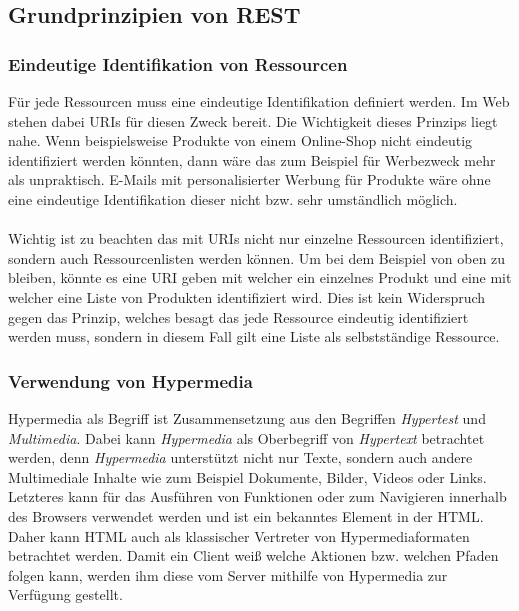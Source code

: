 \subsection{Grundprinzipien von REST}\label{sec:basePricipleREST}
\subsubsection{Eindeutige Identifikation von Ressourcen}
Für jede Ressourcen muss eine eindeutige Identifikation definiert werden. Im Web stehen dabei \glspl{URI} für diesen Zweck bereit. Die Wichtigkeit dieses Prinzips liegt nahe. Wenn beispielsweise Produkte von einem Online-Shop nicht eindeutig identifiziert werden könnten, dann wäre das zum Beispiel für Werbezweck mehr als unpraktisch. E-Mails mit personalisierter Werbung für Produkte wäre ohne eine eindeutige Identifikation dieser nicht bzw. sehr umständlich möglich.\\
\\
Wichtig ist zu beachten das mit \glspl{URI} nicht nur einzelne Ressourcen identifiziert, sondern auch Ressourcenlisten werden können. Um bei dem Beispiel von oben zu bleiben, könnte es eine \gls{URI} geben mit welcher ein einzelnes Produkt und eine mit welcher eine Liste von Produkten identifiziert wird. Dies ist kein Widerspruch gegen das Prinzip, welches besagt das jede Ressource eindeutig identifiziert werden muss, sondern in diesem Fall gilt eine Liste als selbstständige Ressource.

\subsubsection{Verwendung von Hypermedia}
Hypermedia als Begriff ist Zusammensetzung aus den Begriffen \textit{Hypertest} und \textit{Multimedia}. Dabei kann \textit{Hypermedia} als Oberbegriff von \textit{Hypertext} betrachtet werden, denn \textit{Hypermedia} unterstützt nicht nur Texte, sondern auch andere Multimediale Inhalte wie zum Beispiel Dokumente, Bilder, Videos oder Links. Letzteres kann für das Ausführen von Funktionen oder zum Navigieren innerhalb des Browsers verwendet werden und ist ein bekanntes Element in der \gls{HTML}. Daher kann \gls{HTML} auch als klassischer Vertreter von Hypermediaformaten betrachtet werden. Damit ein Client weiß welche Aktionen bzw. welchen Pfaden folgen kann, werden ihm diese vom Server mithilfe von Hypermedia zur Verfügung gestellt.

